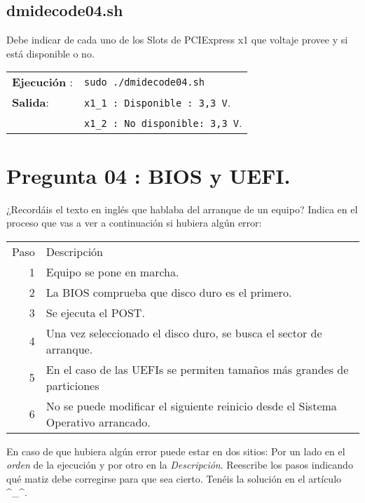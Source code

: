 \documentclass[11pt]{article}
\begin{document}
\subsection{dmidecode04.sh}
\label{sec:org96c164e}

Debe indicar de cada uno de los Slots de PCIExpress x1 que voltaje provee y
si está disponible o no.

\begin{center}
\begin{tabular}{ll}
\textbf{\textbf{Ejecución}} : & \texttt{sudo ./dmidecode04.sh}\\
\textbf{\textbf{Salida}}: & \texttt{x1\_1 : Disponible : 3,3 V}.\\
 & \texttt{x1\_2 : No disponible: 3,3 V}.\\
\end{tabular}
\end{center}


\section{Pregunta 04 : BIOS y UEFI.}
\label{sec:org6a7b66f}

¿Recordáis el texto en inglés que hablaba del arranque de un equipo?
Indica en el proceso que vas a ver a continuación si hubiera algún error:

\begin{center}
\begin{tabular}{rl}
Paso & Descripción\\
1 & Equipo se pone en marcha.\\
2 & La BIOS comprueba que disco duro es el primero.\\
3 & Se ejecuta el POST.\\
4 & Una vez seleccionado el disco duro, se busca el sector de arranque.\\
5 & En el caso de las UEFIs se permiten tamaños más grandes de particiones\\
6 & No se puede modificar el siguiente reinicio desde el Sistema Operativo arrancado.\\
\end{tabular}
\end{center}

En caso de que hubiera algún error puede estar en dos sitios: Por un lado en
el \emph{orden} de la ejecución y por otro en la \emph{Descripción}. Reescribe los pasos
indicando qué matiz debe corregirse para que sea cierto. Tenéis la solución en
el artículo \^{}\_\^{}.
\end{document}

